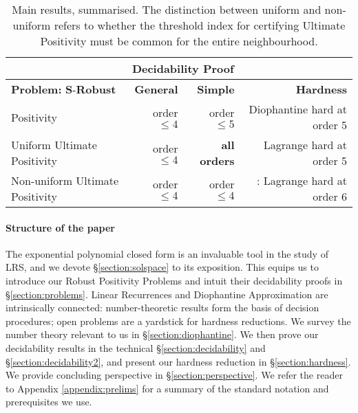 \begin{table}[H]
\begin{tabular}{|l|r|r|r|}
  \hline
  & \multicolumn{2}{c|}{\bf Decidability Proof} &  \\
  \hline
   \textbf{Problem:} $\mathbf{S}$-\textbf{Robust}& \textbf{General}& {\bf Simple} &{\bf Hardness} \\
  \hline
  Positivity & order $\le 4$ & order $\le 5$ &Diophantine hard at order 5\\
  Uniform Ultimate Positivity & order $\le 4$ & \textbf{all orders} & Lagrange hard at order 5 \\
  Non-uniform Ultimate Positivity & order $\le 4$ & order $\le 4$ & \cite{joeljames3,originalarxiv}: Lagrange hard at order 6 
  \\
  \hline
\end{tabular}
\caption{Main results, summarised. The distinction between uniform and non-uniform refers to whether the threshold index for certifying Ultimate Positivity must be common for the entire neighbourhood.}%
\end{table}

\paragraph*{Structure of the paper}
The exponential polynomial closed form is an invaluable tool in the study of LRS, and we devote \S\ref{section:solspace} to its exposition. This equips us to introduce our Robust Positivity Problems and intuit their decidability proofs in \S\ref{section:problems}. Linear Recurrences and Diophantine Approximation are intrinsically connected: number-theoretic results form the basis of decision procedures; open problems are a yardstick for hardness reductions. We survey the number theory relevant to us in \S\ref{section:diophantine}. We then prove our decidability results in the technical \S\ref{section:decidability} and \S\ref{section:decidability2}, and present our hardness reduction in \S\ref{section:hardness}. We provide concluding perspective in \S\ref{section:perspective}. We refer the reader to Appendix \ref{appendix:prelims} for a summary of the standard notation and prerequisites we use.





